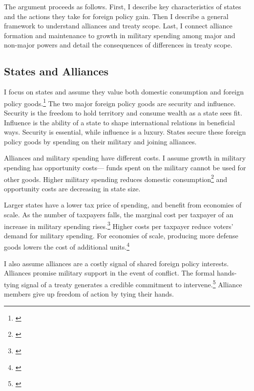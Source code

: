 \documentclass[12pt]{article}
\begin{document}
The argument proceeds as follows.
First, I describe key characteristics of states and the actions they take for foreign policy gain. 
Then I describe a general framework to understand alliances and treaty scope. 
Last, I connect alliance formation and maintenance to growth in military spending among major and non-major powers and detail the consequences of differences in treaty scope.  



\subsection{States and Alliances}


I focus on states and assume they value both domestic consumption and foreign policy goods.\footnote{\citep{Powell1993, Fearon2018}}
The two major foreign policy goods are security and influence. 
Security is the freedom to hold territory and consume wealth as a state sees fit. 
Influence is the ability of a state to shape international relations in beneficial ways. 
Security is essential, while influence is a luxury. 
States secure these foreign policy goods by spending on their military and joining alliances. 


Alliances and military spending have different costs. 
I assume growth in military spending has opportunity costs--- funds spent on the military cannot be used for other goods. 
Higher military spending reduces domestic consumption\footnote{\citep{Fearon2018}} and opportunity costs are decreasing in state size. 


Larger states have a lower tax price of spending, and benefit from economies of scale. 
As the number of taxpayers falls, the marginal cost per taxpayer of an increase in military spending rises.\footnote{\citep{DudleyMontmarquette1981}}
Higher costs per taxpayer reduce voters' demand for military spending. 
For economies of scale, producing more defense goods lowers the cost of additional units.\footnote{\citep{Moravcsik1991, AlesinaSpolaore2006}}


I also assume alliances are a costly signal of shared foreign policy interests. 
Alliances promise military support in the event of conflict. 
The formal hands-tying signal of a treaty generates a credible commitment to intervene.\footnote{\citep{Fearon1997, Leeds2003}}
Alliance members give up freedom of action by tying their hands.  
\end{document}
